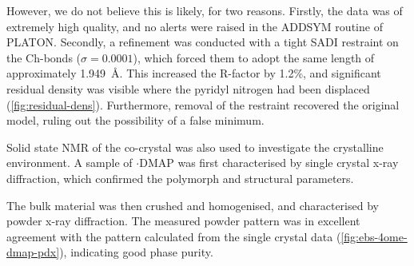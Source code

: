 \begin{refsection}
However, we do not believe this is likely, for two reasons.
Firstly, the data was of extremely high quality, and no alerts were raised in the ADDSYM routine of PLATON.\@
Secondly, a refinement was conducted with a tight SADI restraint on the Ch-bonds ($\sigma=0.0001$), which forced them to adopt the same length of approximately 1.949~\AA.\@
This increased the R-factor by 1.2\%, and significant residual density was visible where the pyridyl nitrogen had been displaced (\cref{fig:residual-dens}).
Furthermore, removal of the restraint recovered the original model, ruling out the possibility of a false minimum.

Solid state NMR of the co-crystal was also used to investigate the crystalline environment.
A sample of $ \cdot $DMAP was first characterised by single crystal x-ray diffraction, which confirmed the polymorph and structural parameters.

The bulk material was then crushed and homogenised, and characterised by powder x-ray diffraction.
The measured powder pattern was in excellent agreement with the pattern calculated from the single crystal data (\cref{fig:ebs-4ome-dmap-pdx}), indicating good phase purity.


\end{refsection}
